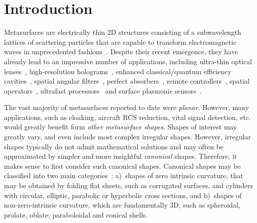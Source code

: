 \documentclass[journal,transaction]{IEEEtran}
\begin{document}
\IEEEdisplaynontitleabstractindextext

\IEEEpeerreviewmaketitle


\section{Introduction}\label{sec:intro}

Metasurfaces are electrically thin 2D structures consisting of a subwavelength lattices of scattering particles that are capable to transform electromagnetic waves in unprecedented fashions~\cite{book_cui2010metamaterials,light_principle_yu2011,overview_metasurface_Holloway_2012,synthesis_planar_KA2015,Tretyakov2016metasurfaces}. Despite their recent emergence, they have already lead to an impressive number of applications, including ultra-thin optical lenses~\cite{lin2014gradient_optic}, high-resolution holograms~\cite{Holography2012}, enhanced classical/quantum efficiency cavities~\cite{chen_Luzhou2017simultaneous}, spatial angular filters~\cite{spatial_fieltering2013}, perfect absorbers~\cite{Single_layer_absorption}, remote controllers~\cite{KA_remote_control2016metasurface}, spatial operators~\cite{computing2014metamaterial}, ultrafast processors~\cite{dataprocess2009ultrafast} and surface plasmonic sensors~\cite{sensors2005generalized}.

The vast majority of metasurfaces reported to date were \emph{planar}. However, many applications, such as cloaking, aircraft RCS reduction, vital signal detection, etc. would greatly benefit form \emph{other metasurface shapes}. Shapes of interest may greatly vary, and even include most complex irregular shapes. However, irregular shapes typically do not admit mathematical solutions and may often be approximated by simpler and more insightful \emph{canonical} shapes. Therefore, it makes sense to first consider such canonical shapes. Canonical shapes may be classified into two main categories~\cite{Ulf_light_and_geo2012}: a)~shapes of zero intrinsic curvature, that may be obtained by folding flat sheets, such as corrugated surfaces, and cylinders with circular, elliptic, parabolic or hyperbolic cross sections, and b)~shapes of non-zero-intrinsic curvature, which are fundamentally 3D, such as spheroidal, prolate, oblate, paraboloidal and conical shells.
\end{document}
